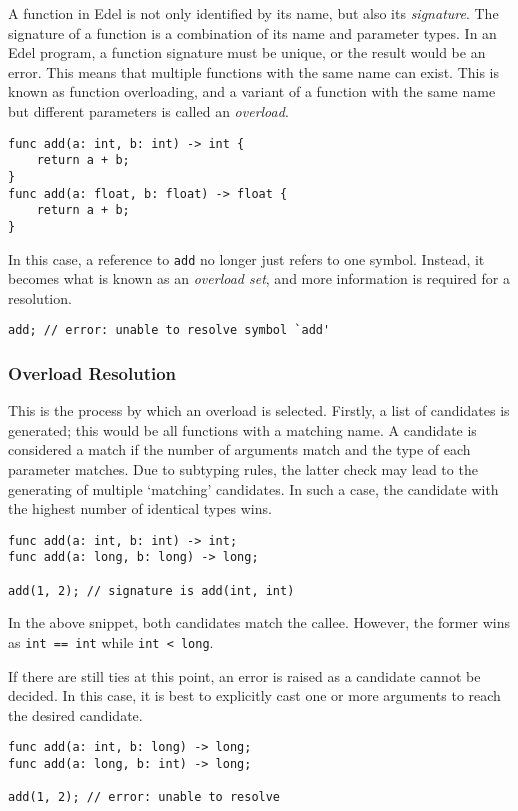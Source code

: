 A function in Edel is not only identified by its name, but also its \textit{signature}.
The signature of a function is a combination of its name and parameter types.
In an Edel program, a function signature must be unique, or the result would be an error.
This means that multiple functions with the same name can exist.
This is known as function overloading, and a variant of a function with the same name but different parameters is called an \textit{overload}.

\begin{lstlisting}[language=CustomLang]
func add(a: int, b: int) -> int {
    return a + b;
}
func add(a: float, b: float) -> float {
    return a + b;
}
\end{lstlisting}

In this case, a reference to \texttt{add} no longer just refers to one symbol.
Instead, it becomes what is known as an \textit{overload set}, and more information is required for a resolution.

\begin{lstlisting}[language=CustomLang]
add; // error: unable to resolve symbol `add'
\end{lstlisting}

\subsubsection{Overload Resolution}

This is the process by which an overload is selected.
Firstly, a list of candidates is generated; this would be all functions with a matching name.
A candidate is considered a match if the number of arguments match and the type of each parameter matches.
Due to subtyping rules, the latter check may lead to the generating of multiple `matching' candidates.
In such a case, the candidate with the highest number of identical types wins.

\begin{lstlisting}[language=CustomLang]
func add(a: int, b: int) -> int;
func add(a: long, b: long) -> long;

add(1, 2); // signature is add(int, int)
\end{lstlisting}

In the above snippet, both candidates match the callee.
However, the former wins as \texttt{int == int} while \texttt{int < long}.

If there are still ties at this point, an error is raised as a candidate cannot be decided.
In this case, it is best to explicitly cast one or more arguments to reach the desired candidate.

\begin{lstlisting}[language=CustomLang]
func add(a: int, b: long) -> long;
func add(a: long, b: int) -> long;

add(1, 2); // error: unable to resolve
\end{lstlisting}
